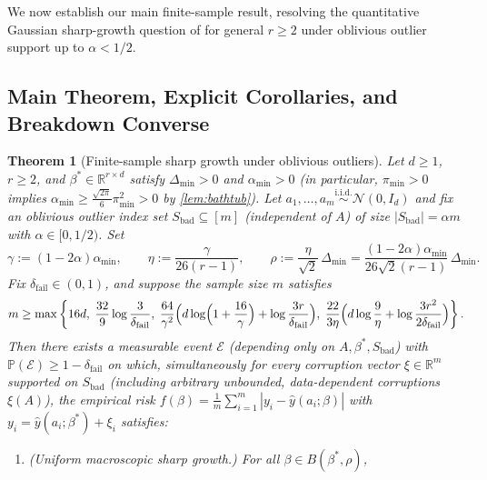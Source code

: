 \documentclass[11pt]{article}
\theoremstyle{plain}
\newtheorem{theorem}{Theorem}[section]
\theoremstyle{remark}
\numberwithin{equation}{section}
\newcommand{\R}{\mathbb{R}}
\newcommand{\Prob}{\mathbb{P}}
\begin{document}
We now establish our main finite-sample result, resolving the quantitative Gaussian sharp-growth question of \cite[Section~5.2.2]{charisopoulos2024superpolyak} for general $r \ge 2$ under oblivious outlier support up to $\alpha < 1/2$.

\subsection{Main Theorem, Explicit Corollaries, and Breakdown Converse}

\begin{theorem}[Finite-sample sharp growth under oblivious outliers]
  \label{thm:main-finite}
  Let $d \ge 1$, $r \ge 2$, and $\beta^* \in \R^{r \times d}$ satisfy $\Delta_{\min} > 0$ and $\alpha_{\min} > 0$ (in particular, $\pi_{\min} > 0$ implies $\alpha_{\min} \ge \frac{\sqrt{2\pi}}{6}\pi_{\min}^2 > 0$ by \cref{lem:bathtub}). Let $a_1, \dots, a_m \stackrel{\mathrm{i.i.d.}}{\sim} \mathcal{N}(0, I_d)$ and fix an oblivious outlier index set $S_{\mathrm{bad}} \subseteq [m]$ (independent of $A$) of size $|S_{\mathrm{bad}}| = \alpha m$ with $\alpha \in [0, 1/2)$. Set
  \[
    \gamma := (1 - 2\alpha)\alpha_{\min},
    \qquad
    \eta := \frac{\gamma}{26(r - 1)},
    \qquad
    \rho := \frac{\eta}{\sqrt{2}}\,\Delta_{\min} = \frac{(1 - 2\alpha)\alpha_{\min}}{26\sqrt{2}(r - 1)}\,\Delta_{\min}.
  \]
  Fix $\delta_{\mathrm{fail}} \in (0, 1)$, and suppose the sample size $m$ satisfies
  \begin{equation}
    \label{eq:sample-complexity}
    m \ge \max\left\{
      16d,\;
      \frac{32}{9}\log\frac{3}{\delta_{\mathrm{fail}}},\;
      \frac{64}{\gamma^2}\Bigl(d\log\Bigl(1 + \frac{16}{\gamma}\Bigr) + \log\frac{3r}{\delta_{\mathrm{fail}}}\Bigr),\;
      \frac{22}{3\eta}\Bigl(d\log\frac{9}{\eta} + \log\frac{3r^2}{2\delta_{\mathrm{fail}}}\Bigr)
    \right\}.
  \end{equation}
  Then there exists a measurable event $\mathcal{E}$ (depending only on $A, \beta^*, S_{\mathrm{bad}}$) with $\Prob(\mathcal{E}) \ge 1 - \delta_{\mathrm{fail}}$ on which, \emph{simultaneously for every corruption vector} $\xi \in \R^m$ supported on $S_{\mathrm{bad}}$ (including arbitrary unbounded, data-dependent corruptions $\xi(A)$), the empirical risk $f(\beta) = \frac{1}{m}\sum_{i=1}^m |y_i - \hat y(a_i; \beta)|$ with $y_i = \hat y(a_i; \beta^*) + \xi_i$ satisfies:
  \begin{enumerate}[label=(\arabic*)]
    \item \emph{(Uniform macroscopic sharp growth.)} For all $\beta \in B(\beta^*, \rho)$,

\end{enumerate}
\end{theorem}
\end{document}
